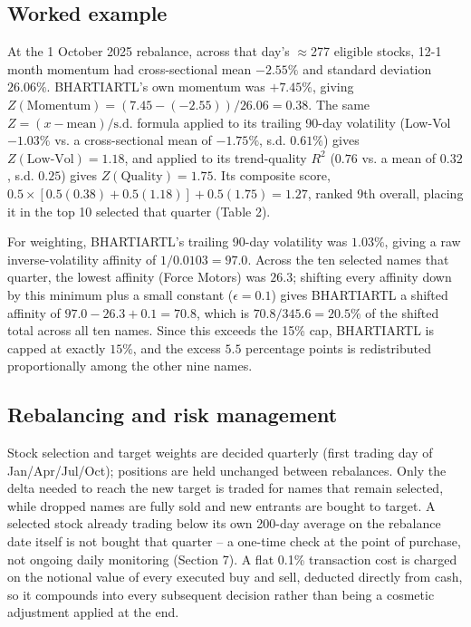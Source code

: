 \documentclass[11pt]{article}
\begin{document}
\subsection{Worked example}
At the 1 October 2025 rebalance, across that day's $\approx$277 eligible stocks, 12-1 month momentum had cross-sectional mean $-2.55\%$ and standard deviation $26.06\%$. BHARTIARTL's own momentum was $+7.45\%$, giving $Z(\text{Momentum}) = (7.45 - (-2.55))/26.06 = 0.38$. The same $Z=(x-\text{mean})/\text{s.d.}$ formula applied to its trailing 90-day volatility (Low-Vol $-1.03\%$ vs. a cross-sectional mean of $-1.75\%$, s.d. $0.61\%$) gives $Z(\text{Low-Vol})=1.18$, and applied to its trend-quality $R^2$ ($0.76$ vs. a mean of $0.32$, s.d. $0.25$) gives $Z(\text{Quality})=1.75$. Its composite score, $0.5\times[0.5(0.38)+0.5(1.18)]+0.5(1.75)=1.27$, ranked 9th overall, placing it in the top 10 selected that quarter (Table 2).

For weighting, BHARTIARTL's trailing 90-day volatility was $1.03\%$, giving a raw inverse-volatility affinity of $1/0.0103=97.0$. Across the ten selected names that quarter, the lowest affinity (Force Motors) was $26.3$; shifting every affinity down by this minimum plus a small constant ($\epsilon=0.1$) gives BHARTIARTL a shifted affinity of $97.0-26.3+0.1=70.8$, which is $70.8/345.6=20.5\%$ of the shifted total across all ten names. Since this exceeds the 15\% cap, BHARTIARTL is capped at exactly $15\%$, and the excess $5.5$ percentage points is redistributed proportionally among the other nine names.

\subsection{Rebalancing and risk management}
Stock selection and target weights are decided quarterly (first trading day of Jan/Apr/Jul/Oct); positions are held unchanged between rebalances. Only the delta needed to reach the new target is traded for names that remain selected, while dropped names are fully sold and new entrants are bought to target. A selected stock already trading below its own 200-day average on the rebalance date itself is not bought that quarter -- a one-time check at the point of purchase, not ongoing daily monitoring (Section 7). A flat 0.1\% transaction cost is charged on the notional value of every executed buy and sell, deducted directly from cash, so it compounds into every subsequent decision rather than being a cosmetic adjustment applied at the end.
\end{document}
